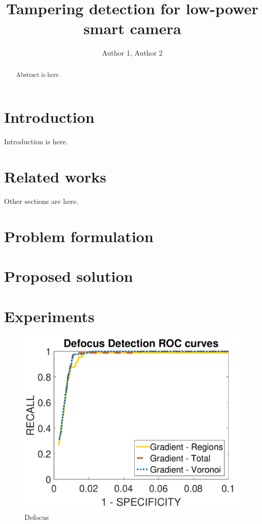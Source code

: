 \documentclass{llncs}
\begin{document}
\title{Tampering detection for low-power smart camera}

\author{Author 1, Author 2}

\maketitle

\begin{abstract}
	
	Abstract is here.
	
\end{abstract}

\section{Introduction}\label{sec:introduction}

Introduction is here.

\section{Related works}\label{sec:relWorks}

Other sections are here. 

\section{Problem formulation}\label{sec:probForm}

\section{Proposed solution}\label{sec:propSol}

\section{Experiments}\label{sec:experiments}
\begin{figure}
\centering
\includegraphics[width=0.7\linewidth]{Immagini/ROCdefocus_cropped.pdf}
\caption{Defocus}
\label{fig:ROCdefocus}
\end{figure}
\end{document}

